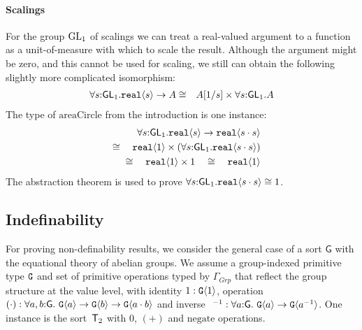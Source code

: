 \paragraph{Scalings}
For the group $\mathrm{GL}_1$ of scalings we can treat
a real-valued argument to a function as a unit-of-measure with
which to scale the result. 
Although the argument might be zero, and this cannot be used for scaling,
we still can obtain the following slightly more complicated
isomorphism:
\begin{eqnarray*}
\forall s\mathord:\mathsf{GL}_1.\textup{\texttt{real}}\langle s \rangle\to A
& \cong &
A[1/s]\times \forall s\mathord:\mathsf{GL}_1.A
\end{eqnarray*}
The type of $\mathrm{areaCircle}$ from the introduction is one instance:
\begin{eqnarray*}
\forall s\mathord:\mathsf{GL}_1.\textup{\texttt{real}}\langle s \rangle\to\textup{\texttt{real}}\langle s\cdot
  s \rangle\\ \quad\cong\quad \textup{\texttt{real}}\langle 1 \rangle\times(\forall
s\mathord:\mathsf{GL}_1.\textup{\texttt{real}}\langle s\cdot s \rangle)\\ \quad\cong\quad
\textup{\texttt{real}}\langle 1 \rangle\times 1\quad\cong\quad \textup{\texttt{real}}\langle 1 \rangle
\end{eqnarray*}
The abstraction theorem is used to prove
$\forall s\mathord:\mathsf{GL}_1.\textup{\texttt{real}}\langle s\cdot s \rangle\cong 1$.


\subsection{Indefinability}
\label{sec:types-indexed-abelian-groups-indef}

\newcommand{\Grp}{\mathit{Grp}}
For proving non-definability results, we
consider the general case of a sort $\mathsf{G}$ with the equational theory of abelian groups.
We assume a group-indexed primitive type $\textup{\texttt{G}}$ and
set of primitive operations typed by $\Gamma_\Grp$ that reflect the group structure at the value level,
with identity $1:\textup{\texttt{G}}\langle 1 \rangle$, operation
$(\cdot): \forall a,b\mathord:\mathsf{G}.\ \tyPrim{G}{a} \to \tyPrim{G}{b} \to \tyPrim{G}{a\cdot b}$
and inverse $\ ^{-1}: \forall a\mathord:\mathsf{G}.\ \textup{\texttt{G}}\langle a \rangle \to \textup{\texttt{G}}\langle a^{-1} \rangle$.
One instance is the sort~$\mathsf{T}_2$ with $0$, $(+)$ and $\mathrm{negate}$ operations.

